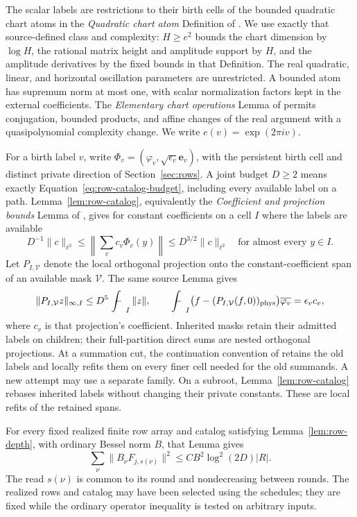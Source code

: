 The scalar labels are restrictions to their birth cells of the
bounded quadratic chart atoms in the \emph{Quadratic chart atom}
Definition of \cite[Section~4]{H}.  We use exactly that
source-defined class and complexity: \(H\ge e^2\) bounds the chart
dimension by \(\log H\), the rational matrix height and amplitude
support by \(H\), and the amplitude derivatives by the fixed
bounds in that Definition.  The real quadratic, linear, and
horizontal oscillation parameters are unrestricted.  A bounded
atom has supremum norm at most one, with scalar normalization
factors kept in the external coefficients.  The
\emph{Elementary chart operations} Lemma of \cite[Section~4]{H}
permits conjugation, bounded products, and affine changes of the
real argument with a quasipolynomial complexity change.  We write
\(e(v)=\exp(2\pi i v)\).

For a birth label \(v\), write
\(\Phi_v=(\varphi_v,\sqrt{\epsilon_v}\mathbf e_v)\), with the
persistent birth cell and distinct private direction of
Section~\ref{sec:rows}.  A joint budget \(D\ge2\) means exactly
Equation~\eqref{eq:row-catalog-budget}, including every available
label on a path.  Lemma~\ref{lem:row-catalog}, equivalently the
\emph{Coefficient and projection bounds} Lemma of
\cite[Section~3]{H}, gives for constant coefficients on a cell \(I\)
where the labels are available
\begin{equation}
 D^{-1}\|c\|_{\ell^2}\le
 \left\|\sum_v c_v\Phi_v(y)\right\|
 \le D^{3/2}\|c\|_{\ell^2}
 \quad\text{for almost every }y\in I.                         \label{eq:h-column-bounds}
\end{equation}
Let \(P_{I,\mathcal V}\) denote the local orthogonal projection onto
the constant-coefficient span of an available mask \(\mathcal V\).
The same source Lemma gives
\[
 \|P_{I,\mathcal V}z\|_{\infty,I}\le D^5\fint_I\|z\|,
 \qquad
 \fint_I\bigl(f-(P_{I,\mathcal V}(f,0))_{\rm phys}\bigr)
       \overline{\varphi_v}=\epsilon_v c_v,
\]
where \(c_v\) is that projection's coefficient.  Inherited masks
retain their admitted labels on children; their full-partition direct
sums are nested orthogonal projections.  At a summation cut, the
continuation convention of \cite[Section~3]{H} retains the old labels
and locally refits them on every finer cell needed for the old
summands.  A new attempt may use a separate family.  On a subroot,
Lemma~\ref{lem:row-catalog} rebases inherited labels without changing
their private constants.  These are local refits of the retained
spans.

For every fixed realized finite row array and catalog satisfying
Lemma~\ref{lem:row-depth}, with ordinary Bessel norm \(B\), that Lemma
gives
\begin{equation}
 \sum_\nu\|B_\nu F_{j,s(\nu)}\|^2
 \le C B^2\log^2(2D)|R|.                                     \label{eq:h-row-use}
\end{equation}
The read \(s(\nu)\) is common to its round and nondecreasing between
rounds.  The realized rows and catalog may have been selected using
the schedules; they are fixed while the ordinary operator inequality
is tested on arbitrary inputs.


